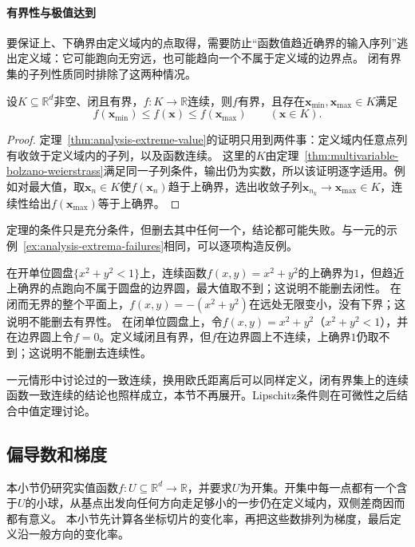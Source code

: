 \paragraph{有界性与极值达到}
要保证上、下确界由定义域内的点取得，需要防止“函数值趋近确界的输入序列”逃出定义域：它可能跑向无穷远，也可能趋向一个不属于定义域的边界点。
闭有界集的子列性质同时排除了这两种情况。
\begin{theorem}[闭有界集上的极值定理]
\label{thm:multivariable-extreme-value}
设$K\subseteq\mathbb R^d$非空、闭且有界，$f:K\to\mathbb R$连续，则$f$有界，且存在$\bm x_{\min},\bm x_{\max}\in K$满足
\[
 f(\bm x_{\min})\leq f(\bm x)\leq f(\bm x_{\max})\qquad(\bm x\in K).
\]
\end{theorem}
\begin{proof}
定理~\ref{thm:analysis-extreme-value}的证明只用到两件事：定义域内任意点列有收敛于定义域内的子列，以及函数连续。
这里的$K$由定理~\ref{thm:multivariable-bolzano-weierstrass}满足同一子列条件，输出仍为实数，所以该证明逐字适用。例如对最大值，取$\bm x_n\in K$使$f(\bm x_n)$趋于上确界，选出收敛子列$\bm x_{n_k}\to\bm x_{\max}\in K$，连续性给出$f(\bm x_{\max})$等于上确界。
\end{proof}
定理的条件只是充分条件，但删去其中任何一个，结论都可能失败。与一元的示例~\ref{ex:analysis-extrema-failures}相同，可以逐项构造反例。
\begin{example}
\label{ex:multivariable-extreme-value-failures}
在开单位圆盘$\{x^2+y^2<1\}$上，连续函数$f(x,y)=x^2+y^2$的上确界为$1$，但趋近上确界的点跑向不属于圆盘的边界圆，最大值取不到；这说明不能删去闭性。
在闭而无界的整个平面上，$f(x,y)=-(x^2+y^2)$在远处无限变小，没有下界；这说明不能删去有界性。
在闭单位圆盘上，令$f(x,y)=x^2+y^2$（$x^2+y^2<1$），并在边界圆上令$f=0$。定义域闭且有界，但$f$在边界圆上不连续，上确界$1$仍取不到；这说明不能删去连续性。
\end{example}

一元情形中讨论过的一致连续，换用欧氏距离后可以同样定义，闭有界集上的连续函数一致连续的结论也照样成立，本节不再展开。Lipschitz条件则在可微性之后结合中值定理讨论。

\subsection{偏导数和梯度}

本小节仍研究实值函数$f:U\subseteq\mathbb R^d\to\mathbb R$，并要求$U$为开集。开集中每一点都有一个含于$U$的小球，从基点出发向任何方向走足够小的一步仍在定义域内，双侧差商因而都有意义。
本小节先计算各坐标切片的变化率，再把这些数排列为梯度，最后定义沿一般方向的变化率。

